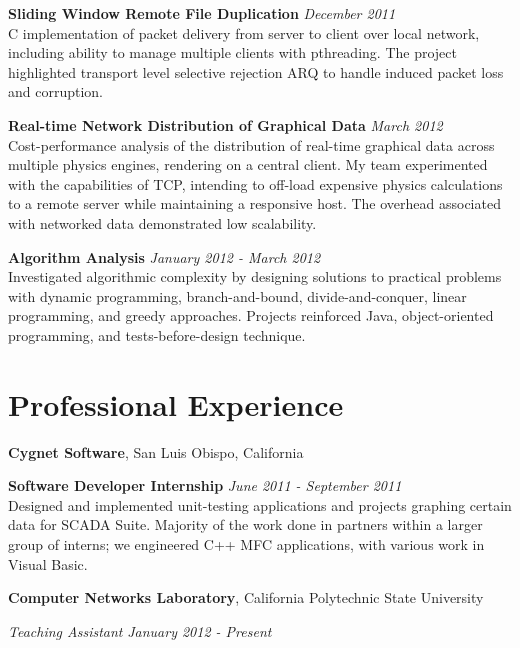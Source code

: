 \documentclass[margin,line]{res}
\begin{document}
\begin{resume}
        {\bf Sliding Window Remote File Duplication} \hfill {\em December 2011}\\
        C implementation of packet delivery from server to client over local network, including ability to manage multiple clients with pthreading. The project highlighted transport level selective rejection ARQ to handle induced packet loss and corruption.
        \vspace*{.05in}

        {\bf Real-time Network Distribution of Graphical Data} \hfill {\em March 2012}\\
        Cost-performance analysis of the distribution of real-time graphical data across multiple physics engines, rendering on a central client. My team experimented with the capabilities of TCP, intending to off-load expensive physics calculations to a remote server while maintaining a responsive host. The overhead associated with networked data demonstrated low scalability.
        \vspace*{.05in}

        {\bf Algorithm Analysis} \hfill {\em January 2012 - March 2012}\\
        Investigated algorithmic complexity by designing solutions to practical problems with dynamic programming, branch-and-bound, divide-and-conquer, linear programming, and greedy approaches. Projects reinforced Java, object-oriented programming, and tests-before-design technique.
        \vspace*{.05in}

        \section{\sc Professional Experience}
        {\bf Cygnet Software}, San Luis Obispo, California

        \vspace{-.3cm}
        {\bf Software Developer Internship} \hfill {\em June 2011 - September 2011}\\
        Designed and implemented unit-testing applications and projects graphing certain data for SCADA Suite. Majority of the work done in partners within a larger group of interns; we engineered C++ MFC applications, with various work in Visual Basic.

        {\bf Computer Networks Laboratory}, California Polytechnic State University

        \vspace{-.3cm}
        {\em Teaching Assistant} \hfill {\em January 2012 - Present}\\


\end{resume}
\end{document}
